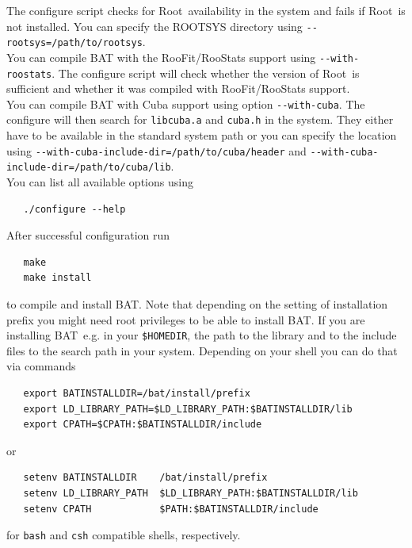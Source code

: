 \documentclass[11pt, a4paper]{article}
\newcommand{\bat}{{\sc BAT}}
\newcommand{\Root}{{\sc Root}}
\begin{document}
\noindent
The configure script checks for \Root\ availability in the system and
fails if \Root\ is not installed. You can specify the ROOTSYS directory
using \verb|--rootsys=/path/to/rootsys|. \\

\noindent
You can compile BAT with the RooFit/RooStats support using
\verb|--with-roostats|. The configure script will check whether the version of
\Root\ is sufficient and whether it was compiled with RooFit/RooStats
support. \\

\noindent
You can compile BAT with Cuba support using option \verb|--with-cuba|.
The configure will then search for \verb|libcuba.a| and \verb|cuba.h| in
the system. They either have to be available in the standard system path
or you can specify the location using
\verb|--with-cuba-include-dir=/path/to/cuba/header|
and \verb|--with-cuba-include-dir=/path/to/cuba/lib|. \\

\noindent
You can list all available options using
%
\begin{verbatim}
   ./configure --help
\end{verbatim}

\enlargethispage{1cm}

\noindent
After successful configuration run
%
\begin{verbatim}
   make
   make install
\end{verbatim}
%
to compile and install \bat. Note that depending on the setting of
installation prefix you might need root privileges to be able to
install \bat. If you are installing \bat\ e.g. in your
\verb|$HOMEDIR|, %
the path to the library and to the include files to the search path in
your system. Depending on your shell you can do that via commands
%
\begin{verbatim}
   export BATINSTALLDIR=/bat/install/prefix
   export LD_LIBRARY_PATH=$LD_LIBRARY_PATH:$BATINSTALLDIR/lib
   export CPATH=$CPATH:$BATINSTALLDIR/include
\end{verbatim}
%
or
%
\begin{verbatim}
   setenv BATINSTALLDIR    /bat/install/prefix
   setenv LD_LIBRARY_PATH  $LD_LIBRARY_PATH:$BATINSTALLDIR/lib
   setenv CPATH            $PATH:$BATINSTALLDIR/include
\end{verbatim}
%
for \verb|bash| and \verb|csh| compatible shells, respectively. \\
\end{document}
